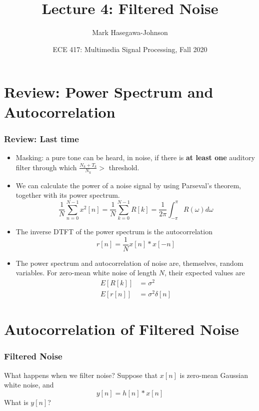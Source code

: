 \documentclass{beamer}
\title{Lecture 4: Filtered Noise}
\author{Mark Hasegawa-Johnson}
\date{ECE 417: Multimedia Signal Processing, Fall 2020}
\begin{document}
\begin{frame}
  \maketitle
\end{frame}

\begin{frame}
  \tableofcontents
\end{frame}

\section[Review]{Review: Power Spectrum and Autocorrelation}
\setcounter{subsection}{1}

\begin{frame}
  \frametitle{Review: Last time}
  \begin{itemize}
  \item Masking: a pure tone can be heard, in noise, if there is {\bf at least one}
    auditory filter through which $\frac{N_k+T_k}{N_k}>$ threshold.
  \item We can calculate the power of a noise signal by using Parseval's theorem, together with
    its power spectrum.
    \[
    \frac{1}{N}\sum_{n=0}^{N-1}x^2[n] = \frac{1}{N}\sum_{k=0}^{N-1}R[k]=
    \frac{1}{2\pi}\int_{-\pi}^{\pi}R(\omega)d\omega
    \]
  \item The inverse DTFT of the power spectrum is the autocorrelation
    \[
    r[n] = \frac{1}{N} x[n]\ast x[-n]
    \]
  \item The power spectrum and autocorrelation of noise are, themselves, random variables.
    For zero-mean white noise of length $N$, their expected values are
    \begin{align*}
      E\left[R[k]\right] &= \sigma^2\\
      E\left[r[n]\right] &= \sigma^2\delta[n]
    \end{align*}
  \end{itemize}
\end{frame}

\section[Autocorrelation]{Autocorrelation of Filtered Noise}
\setcounter{subsection}{1}

\begin{frame}
  \frametitle{Filtered Noise}

  What happens when we filter noise?  Suppose that $x[n]$ is zero-mean
  Gaussian white noise, and
  \[
  y[n] = h[n]\ast x[n]
  \]
  What is $y[n]$?
\end{frame}
\end{document}
